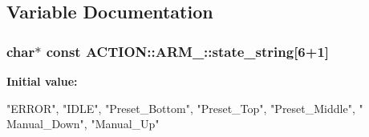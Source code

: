 \subsection{\-Variable \-Documentation}
\hypertarget{namespace_a_c_t_i_o_n_1_1_a_r_m___a1766b2978b692ab20690c8a580dc62c8}{
\subsubsection[{state\-\_\-string}]{\setlength{\rightskip}{0pt plus 5cm}char$\ast$ const {\bf \-A\-C\-T\-I\-O\-N\-::\-A\-R\-M\-\_\-\-::state\-\_\-string}\mbox{[}6+1\mbox{]}}}
\label{namespace_a_c_t_i_o_n_1_1_a_r_m___a1766b2978b692ab20690c8a580dc62c8}
{\bfseries \-Initial value\-:}
\begin{DoxyCode}

        {"ERROR", "IDLE", "Preset_Bottom", "Preset_Top", "Preset_Middle", "
      Manual_Down", "Manual_Up"}
\end{DoxyCode}
